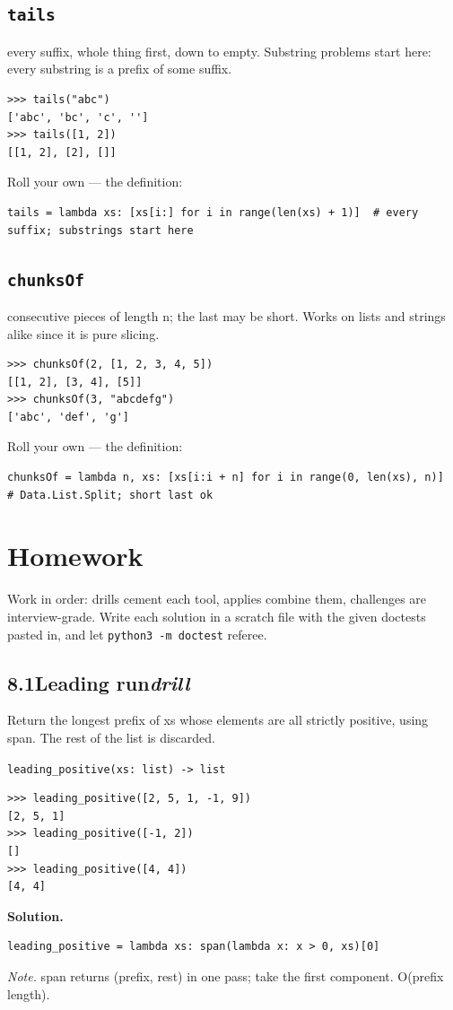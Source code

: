 \documentclass[10pt,letterpaper]{book}
\begin{document}
\subsection{\texttt{tails}}\label{def:tails}
every suffix, whole thing first, down to empty. Substring problems start here: every substring is a prefix of some suffix.
\begin{lstlisting}[style=ex]
>>> tails("abc")
['abc', 'bc', 'c', '']
>>> tails([1, 2])
[[1, 2], [2], []]
\end{lstlisting}

Roll your own --- the definition:

\begin{lstlisting}[style=ex]
tails = lambda xs: [xs[i:] for i in range(len(xs) + 1)]  # every suffix; substrings start here
\end{lstlisting}
\subsection{\texttt{chunksOf}}\label{def:chunksOf}
consecutive pieces of length n; the last may be short. Works on lists and strings alike since it is pure slicing.
\begin{lstlisting}[style=ex]
>>> chunksOf(2, [1, 2, 3, 4, 5])
[[1, 2], [3, 4], [5]]
>>> chunksOf(3, "abcdefg")
['abc', 'def', 'g']
\end{lstlisting}

Roll your own --- the definition:

\begin{lstlisting}[style=ex]
chunksOf = lambda n, xs: [xs[i:i + n] for i in range(0, len(xs), n)]  # Data.List.Split; short last ok
\end{lstlisting}
\section{Homework}
Work in order: drills cement each tool, applies combine them,
challenges are interview-grade. Write each solution in a scratch file with
the given doctests pasted in, and let \texttt{python3 -m doctest} referee.
\subsection*{8.1\quad Leading run\hfill\textnormal{\textit{drill}}}
Return the longest prefix of xs whose elements are all strictly positive, using span. The rest of the list is discarded.

\noindent\texttt{leading\_positive(xs: list) -> list}
\begin{lstlisting}[style=ex]
>>> leading_positive([2, 5, 1, -1, 9])
[2, 5, 1]
>>> leading_positive([-1, 2])
[]
>>> leading_positive([4, 4])
[4, 4]
\end{lstlisting}
\noindent\textbf{Solution.}
\begin{lstlisting}[style=code]
leading_positive = lambda xs: span(lambda x: x > 0, xs)[0]
\end{lstlisting}
\noindent\textit{Note.} span returns (prefix, rest) in one pass; take the first component. O(prefix length).
\end{document}
